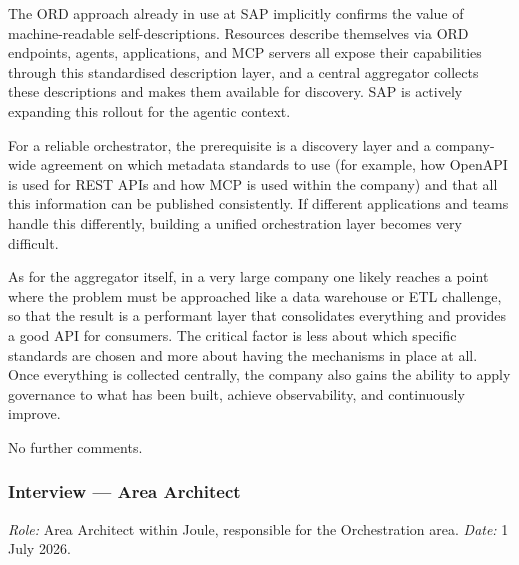 \medskip{}

The ORD approach already in use at SAP implicitly confirms the value of machine-readable self-descriptions. Resources describe themselves via ORD endpoints, agents, applications, and MCP servers all expose their capabilities through this standardised description layer, and a central aggregator collects these descriptions and makes them available for discovery. SAP is actively expanding this rollout for the agentic context.

\medskip{}

For a reliable orchestrator, the prerequisite is a discovery layer and a company-wide agreement on which metadata standards to use (for example, how OpenAPI is used for REST APIs and how MCP is used within the company) and that all this information can be published consistently. If different applications and teams handle this differently, building a unified orchestration layer becomes very difficult.

As for the aggregator itself, in a very large company one likely reaches a point where the problem must be approached like a data warehouse or ETL challenge, so that the result is a performant layer that consolidates everything and provides a good API for consumers. The critical factor is less about which specific standards are chosen and more about having the mechanisms in place at all. Once everything is collected centrally, the company also gains the ability to apply governance to what has been built, achieve observability, and continuously improve.

\medskip{}

No further comments.

\subsubsection{Interview --- Area Architect}

\noindent\textit{Role:} Area Architect within Joule, responsible for the Orchestration area. \textit{Date:} 1 July 2026.

\medskip{}

